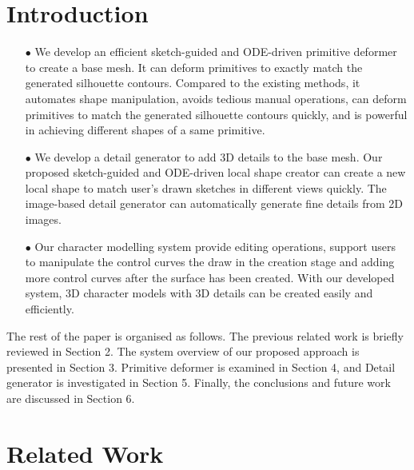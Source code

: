 \documentclass[10pt,twocolumn,letterpaper]{article}
\begin{document}
\section{Introduction}
\begin{itemize}
  \item[$\bullet$] We develop an efficient sketch-guided and ODE-driven primitive deformer to create a base mesh. It can deform primitives to exactly match the generated silhouette contours. Compared to the existing methods, it automates shape manipulation, avoids tedious manual operations, can deform primitives to match the generated silhouette contours quickly, and is powerful in achieving different shapes of a same primitive.
  \item[$\bullet$] We develop a detail generator to add 3D details to the base mesh. Our proposed sketch-guided and ODE-driven local shape creator can create a new local shape to match user's drawn sketches in different views quickly. The image-based detail generator can automatically generate fine details from 2D images. 
  \item[$\bullet$] Our character modelling system provide editing operations, support users to manipulate the control curves the draw in the creation stage and adding more control curves after the surface has been created. With our developed system, 3D character models with 3D details can be created easily and efficiently.
\end{itemize}
The rest of the paper is organised as follows. The previous related work is briefly reviewed in Section 2. The system overview of our proposed approach is presented in Section 3. Primitive deformer is examined in Section 4, and Detail generator is investigated in Section 5. Finally, the conclusions and future work are discussed in Section 6. 


\section{Related Work}
\end{document}
